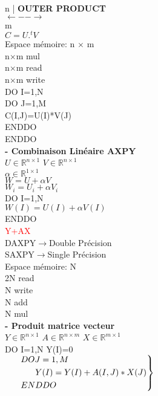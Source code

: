 \documentclass{article}
\begin{document}
    n |
    \textbf{OUTER PRODUCT}\\
    \hspace*{1.7cm}$\leftarrow -- \rightarrow$\\
    \hspace*{2.2cm}m\\
    $C=U.^tV$\\
    Espace mémoire: n $\times$ m\\
    n$\times$m mul\\
    n$\times$m read\\
    n$\times$m write\\
    DO I=1,N\\
    \hspace*{0.6cm}DO J=1,M\\
    \hspace*{1.2cm}C(I,J)=U(I)*V(J)\\
    \hspace*{0.6cm}ENDDO\\
    ENDDO\\
    \textbf{- Combinaison Linéaire AXPY}\\
    $U \in \mathbb{R}^{n \times 1}$
    $V \in \mathbb{R}^{n \times 1}$\\
    $\alpha \in \mathbb{R}^{1\times 1}$\\
    $W=U+\alpha V$\\
    $W_i=U_i+\alpha V_i$\\
    DO I=1,N\\
    \hspace*{0.6cm}$W(I)=U(I)+\alpha V(I)$\\
    ENDDO\\
    \textcolor{red}{Y+AX}\\
    DAXPY$\to$Double Précision\\
    SAXPY$\to$Single Précision\\
    Espace mémoire: N\\
    2N read\\
    N write\\
    N add\\
    N mul\\
    \textbf{- Produit matrice vecteur}\\
    $Y\in \mathbb{R}^{n \times 1}$
    $A\in \mathbb{R}^{n \times m}$
    $X\in \mathbb{R}^{m \times 1}$\\
    DO I=1,N
    \hspace*{0.6cm}Y(I)=0\\
    $\begin{rcases}
        \hspace*{0.6cm}DO J=1,M\\
        \hspace*{1.2cm}Y(I)=Y(I)+A(I,J)*X(J)\\
        \hspace*{0.6cm}ENDDO
    \end{rcases}$
\end{document}
